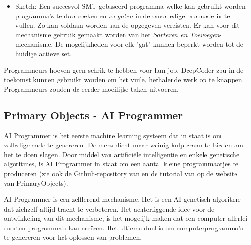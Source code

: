 \begin{description}
\begin{itemize}
		\item Sketch: Een succesvol SMT-gebaseerd programma welke kan gebruikt worden programma's te doorzoeken en zo \textit{gaten} in de onvolledige broncode in te vullen. Zo kan voldaan worden aan de opgegeven vereisten. Er kan voor dit mechanisme gebruik gemaakt worden van het \textit{Sorteren en Toevoegen}-mechanisme. De mogelijkheden voor elk "gat" kunnen beperkt worden tot de huidige actieve set.
	\end{itemize}
\end{description}

Programmeurs hoeven geen schrik te hebben voor hun job. DeepCoder zou in de toekomst kunnen gebruikt worden om het vuile, herhalende werk op te knappen. Programmeurs zouden de eerder moeilijke taken uitvoeren.

\subsection{Primary Objects - AI Programmer}

AI Programmer is het eerste machine learning systeem dat in staat is om volledige code te genereren. De mens dient maar weinig hulp eraan te bieden om het te doen slagen. Door middel van artificiële intelligentie en enkele genetische algoritmes, is AI Programmer in staat om een aantal kleine programmaatjes te produceren (zie ook de Github-repository van \textcite{github} en de tutorial van \textcite{primaryObject} op de website van PrimaryObjects).

AI Programmer is een zelflerend mechanisme. Het is een AI genetisch algoritme dat zichzelf altijd tracht te verbeteren. Het achterliggende idee voor de ontwikkeling van dit mechanisme, is het mogelijk maken dat een computer allerlei soorten programma's kan creëren. Het ultieme doel is om computerprogramma’s te genereren voor het oplossen van problemen.

